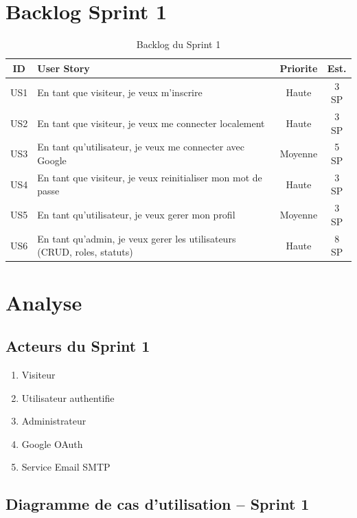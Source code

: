 \documentclass[a4paper,12pt]{report}
\begin{document}
\section{Backlog Sprint 1}

\begin{table}[H]
  \centering
  \caption{Backlog du Sprint 1}
  \label{tab:backlog_s1}
  \begin{tabular}{|c|p{7.5cm}|c|c|}
    \hline
    \textbf{ID} & \textbf{User Story} & \textbf{Priorite} & \textbf{Est.} \\
    \hline
    US1 & En tant que visiteur, je veux m'inscrire & Haute & 3 SP \\
    \hline
    US2 & En tant que visiteur, je veux me connecter localement & Haute & 3 SP \\
    \hline
    US3 & En tant qu'utilisateur, je veux me connecter avec Google & Moyenne & 5 SP \\
    \hline
    US4 & En tant que visiteur, je veux reinitialiser mon mot de passe & Haute & 3 SP \\
    \hline
    US5 & En tant qu'utilisateur, je veux gerer mon profil & Moyenne & 3 SP \\
    \hline
    US6 & En tant qu'admin, je veux gerer les utilisateurs (CRUD, roles, statuts) & Haute & 8 SP \\
    \hline
  \end{tabular}
\end{table}

\section{Analyse}

\subsection{Acteurs du Sprint 1}
\begin{enumerate}
  \item Visiteur
  \item Utilisateur authentifie
  \item Administrateur
  \item Google OAuth
  \item Service Email SMTP
\end{enumerate}

\subsection{Diagramme de cas d'utilisation -- Sprint 1}
\end{document}

